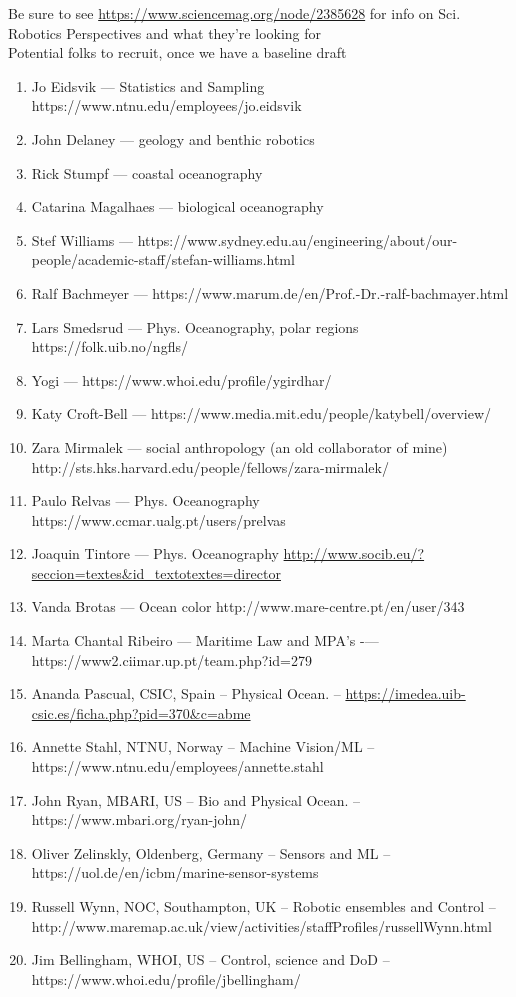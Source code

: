 \documentclass[12pt]{article}
\begin{document}
\setcounter{secnumdepth}{2} 

\large{Be sure to see \url{https://www.sciencemag.org/node/2385628}
  for info on
  Sci. Robotics Perspectives and what they're looking for}\\


Potential folks to recruit, once we have a baseline draft

\begin{enumerate}[noitemsep,topsep=0pt,parsep=0pt,partopsep=0pt]
  
\item Jo Eidsvik — Statistics and Sampling https://www.ntnu.edu/employees/jo.eidsvik
\item John Delaney — geology and benthic robotics
\item Rick Stumpf — coastal oceanography 
\item Catarina Magalhaes — biological oceanography
\item Stef Williams — https://www.sydney.edu.au/engineering/about/our-people/academic-staff/stefan-williams.html
\item Ralf Bachmeyer — https://www.marum.de/en/Prof.-Dr.-ralf-bachmayer.html
\item Lars Smedsrud — Phys. Oceanography, polar regions https://folk.uib.no/ngfls/
\item Yogi — https://www.whoi.edu/profile/ygirdhar/
\item Katy Croft-Bell  — https://www.media.mit.edu/people/katybell/overview/
\item Zara Mirmalek — social anthropology (an old collaborator of mine) http://sts.hks.harvard.edu/people/fellows/zara-mirmalek/
\item Paulo Relvas — Phys. Oceanography https://www.ccmar.ualg.pt/users/prelvas
\item Joaquin Tintore — Phys. Oceanography \url{http://www.socib.eu/?seccion=textes&id_textotextes=director}
\item Vanda Brotas — Ocean color http://www.mare-centre.pt/en/user/343
\item Marta Chantal Ribeiro — Maritime Law and MPA’s -— https://www2.ciimar.up.pt/team.php?id=279
\item Ananda Pascual, CSIC, Spain -- Physical Ocean. -- \url{https://imedea.uib-csic.es/ficha.php?pid=370&c=abme}
\item Annette Stahl, NTNU, Norway -- Machine Vision/ML -- https://www.ntnu.edu/employees/annette.stahl
\item John Ryan, MBARI, US -- Bio and Physical Ocean. -- https://www.mbari.org/ryan-john/
\item Oliver Zelinskly, Oldenberg, Germany -- Sensors and ML -- https://uol.de/en/icbm/marine-sensor-systems
\item Russell Wynn, NOC, Southampton, UK  -- Robotic ensembles and
  Control -- http://www.maremap.ac.uk/view/activities/staffProfiles/russellWynn.html
\item Jim Bellingham, WHOI, US -- Control, science and DoD  -- https://www.whoi.edu/profile/jbellingham/

\end{enumerate}
\end{document}
